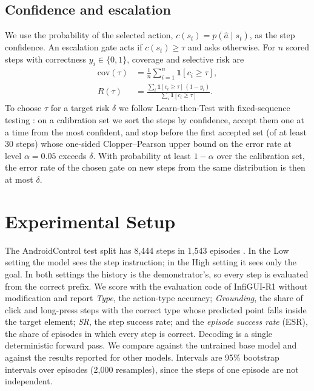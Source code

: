 \documentclass{article}
\begin{document}
\subsection{Confidence and escalation}
\label{sec:gate}
We use the probability of the selected action, $c(s_t) = p(\hat a \mid s_t)$, as the step confidence. An
escalation gate acts if $c(s_t) \geq \tau$ and asks otherwise. For $n$ scored steps with correctness
$y_i \in \{0,1\}$, coverage and selective risk are
\begin{align}
  \mathrm{cov}(\tau) &= \frac{1}{n}\sum_{i=1}^{n} \mathbf{1}[c_i \geq \tau], \\
  R(\tau) &= \frac{\sum_{i} \mathbf{1}[c_i \geq \tau]\,(1-y_i)}{\sum_{i} \mathbf{1}[c_i \geq \tau]}.
\end{align}
To choose $\tau$ for a target risk $\delta$ we follow Learn-then-Test with fixed-sequence testing
\citep{angelopoulos2021ltt}: on a calibration set we sort the steps by confidence, accept them one at a time from the
most confident, and stop before the first accepted set (of at least 30 steps) whose one-sided Clopper--Pearson upper
bound on the error rate at level $\alpha = 0.05$ exceeds $\delta$. With probability at least $1-\alpha$ over the
calibration set, the error rate of the chosen gate on new steps from the same distribution is then at most $\delta$.

\section{Experimental Setup}
\label{sec:setup}

The AndroidControl test split has 8{,}444 steps in 1{,}543 episodes \citep{androidcontrol2024}. In the Low setting
the model sees the step instruction; in the High setting it sees only the goal. In both settings the history is
the demonstrator's, so every step is evaluated from the correct prefix. We score with the evaluation code of
InfiGUI-R1 \citep{infiguir1} without modification and report \emph{Type}, the action-type accuracy;
\emph{Grounding}, the share of click and long-press steps with the correct type whose predicted point falls inside
the target element; \emph{SR}, the step success rate; and the \emph{episode success rate} (ESR), the share of
episodes in which every step is correct. Decoding is a single deterministic forward pass. We compare against the
untrained base model and against the results reported for other models. Intervals are 95\% bootstrap intervals over
episodes (2{,}000 resamples), since the steps of one episode are not independent.
\end{document}
